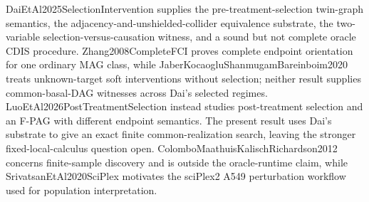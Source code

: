 DaiEtAl2025SelectionIntervention supplies the pre-treatment-selection twin-graph semantics, the adjacency-and-unshielded-collider equivalence substrate, the two-variable selection-versus-causation witness, and a sound but not complete oracle CDIS procedure.  Zhang2008CompleteFCI proves complete endpoint orientation for one ordinary MAG class, while JaberKocaogluShanmugamBareinboim2020 treats unknown-target soft interventions without selection; neither result supplies common-basal-DAG witnesses across Dai's selected regimes.  LuoEtAl2026PostTreatmentSelection instead studies post-treatment selection and an F-PAG with different endpoint semantics.  The present result uses Dai's substrate to give an exact finite common-realization search, leaving the stronger fixed-local-calculus question open.  ColomboMaathuisKalischRichardson2012 concerns finite-sample discovery and is outside the oracle-runtime claim, while SrivatsanEtAl2020SciPlex motivates the sciPlex2 A549 perturbation workflow used for population interpretation.